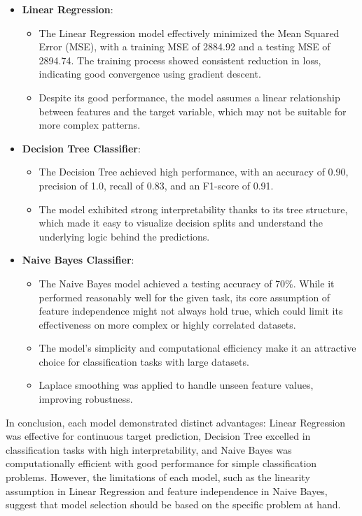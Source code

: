 \documentclass[12pt]{article}
\begin{document}
\begin{itemize}
    \item \textbf{Linear Regression}:
    \begin{itemize}
        \item The Linear Regression model effectively minimized the Mean Squared Error (MSE), with a training MSE of 2884.92 and a testing MSE of 2894.74. The training process showed consistent reduction in loss, indicating good convergence using gradient descent.
        \item Despite its good performance, the model assumes a linear relationship between features and the target variable, which may not be suitable for more complex patterns.
    \end{itemize}

    \item \textbf{Decision Tree Classifier}:
    \begin{itemize}
        \item The Decision Tree achieved high performance, with an accuracy of 0.90, precision of 1.0, recall of 0.83, and an F1-score of 0.91.
        \item The model exhibited strong interpretability thanks to its tree structure, which made it easy to visualize decision splits and understand the underlying logic behind the predictions.
    \end{itemize}

    \item \textbf{Naive Bayes Classifier}:
    \begin{itemize}
        \item The Naive Bayes model achieved a testing accuracy of 70\%. While it performed reasonably well for the given task, its core assumption of feature independence might not always hold true, which could limit its effectiveness on more complex or highly correlated datasets.
        \item The model's simplicity and computational efficiency make it an attractive choice for classification tasks with large datasets.
        \item Laplace smoothing was applied to handle unseen feature values, improving robustness.
    \end{itemize}

\end{itemize}

In conclusion, each model demonstrated distinct advantages: Linear Regression was effective for continuous target prediction, Decision Tree excelled in classification tasks with high interpretability, and Naive Bayes was computationally efficient with good performance for simple classification problems. However, the limitations of each model, such as the linearity assumption in Linear Regression and feature independence in Naive Bayes, suggest that model selection should be based on the specific problem at hand.
\end{document}
